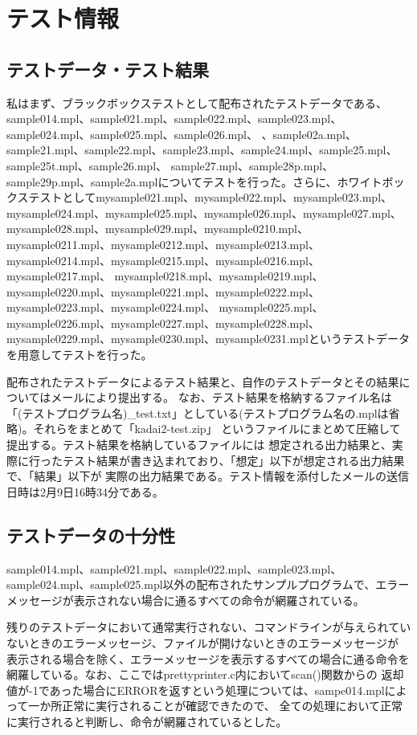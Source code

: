 \documentclass{jarticle}
\begin{document}
\section{テスト情報}
\subsection{テストデータ・テスト結果}
私はまず、ブラックボックステストとして配布されたテストデータである、sample014.mpl、sample021.mpl、sample022.mpl、sample023.mpl、sample024.mpl、sample025.mpl、sample026.mpl、
、sample02a.mpl、sample21.mpl、sample22.mpl、sample23.mpl、sample24.mpl、sample25.mpl、sample25t.mpl、sample26.mpl、
sample27.mpl、sample28p.mpl、sample29p.mpl、sample2a.mplについてテストを行った。さらに、ホワイトボックステストとしてmysample021.mpl、mysample022.mpl、mysample023.mpl、
mysample024.mpl、mysample025.mpl、mysample026.mpl、mysample027.mpl、mysample028.mpl、mysample029.mpl、mysample0210.mpl、
mysample0211.mpl、mysample0212.mpl、mysample0213.mpl、mysample0214.mpl、mysample0215.mpl、mysample0216.mpl、mysample0217.mpl、
mysample0218.mpl、mysample0219.mpl、mysample0220.mpl、mysample0221.mpl、mysample0222.mpl、mysample0223.mpl、mysample0224.mpl、
mysample0225.mpl、mysample0226.mpl、mysample0227.mpl、mysample0228.mpl、mysample0229.mpl、mysample0230.mpl、mysample0231.mplというテストデータを用意してテストを行った。

配布されたテストデータによるテスト結果と、自作のテストデータとその結果についてはメールにより提出する。
なお、テスト結果を格納するファイル名は「(テストプログラム名)\_test.txt」としている(テストプログラム名の.mplは省略)。それらをまとめて「kadai2-test.zip」
というファイルにまとめて圧縮して提出する。テスト結果を格納しているファイルには
想定される出力結果と、実際に行ったテスト結果が書き込まれており、「想定」以下が想定される出力結果で、「結果」以下が
実際の出力結果である。テスト情報を添付したメールの送信日時は2月9日16時34分である。

\subsection{テストデータの十分性}
sample014.mpl、sample021.mpl、sample022.mpl、sample023.mpl、sample024.mpl、sample025.mpl以外の配布されたサンプルプログラムで、エラーメッセージが表示されない場合に通るすべての命令が網羅されている。

残りのテストデータにおいて通常実行されない、コマンドラインが与えられていないときのエラーメッセージ、ファイルが開けないときのエラーメッセージが
表示される場合を除く、エラーメッセージを表示するすべての場合に通る命令を網羅している。なお、ここではprettyprinter.c内においてscan()関数からの
返却値が-1であった場合にERRORを返すという処理については、sampe014.mplによって一か所正常に実行されることが確認できたので、
全ての処理において正常に実行されると判断し、命令が網羅されているとした。
\end{document}
